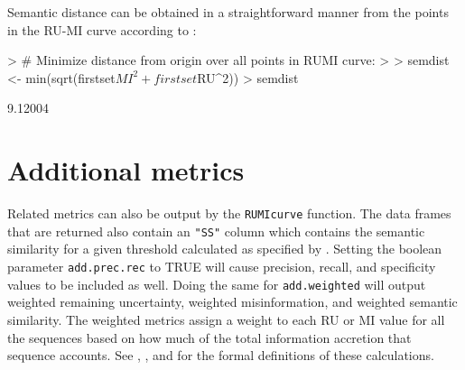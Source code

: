\documentclass{article}
\begin{document}
Semantic distance can be obtained in a straightforward manner from the points in the RU-MI curve according to :

\begin{Schunk}
\begin{Sinput}
> # Minimize distance from origin over all points in RUMI curve:
> 
> semdist <- min(sqrt(firstset$MI^2 + firstset$RU^2))
> semdist
\end{Sinput}
\begin{Soutput}
[1] 9.12004
\end{Soutput}
\end{Schunk}


\section{Additional metrics}

Related metrics can also be output by the \texttt{RUMIcurve} function. The data frames that are returned also contain an \texttt{"SS"} column which contains the semantic similarity for a given threshold calculated as specified by . Setting the boolean parameter \texttt{add.prec.rec} to TRUE will cause precision, recall, and specificity values to be included as well. Doing the same for \texttt{add.weighted} will output weighted remaining uncertainty, weighted misinformation, and weighted semantic similarity. The weighted metrics assign a weight to each RU or MI value for all the sequences based on how much of the total information accretion that sequence accounts. See , , and  for the formal definitions of these calculations.
\end{document}
